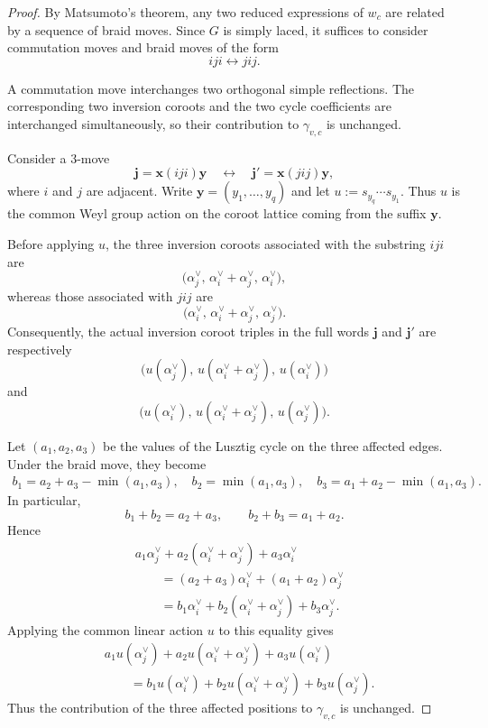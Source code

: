 \documentclass[12pt, reqno]{amsart}
\theoremstyle{plain}
\theoremstyle{definition}
\numberwithin{equation}{section}
\begin{document}
\begin{proof}
By Matsumoto's theorem, any two reduced expressions of \(w_c\) are
related by a sequence of braid moves. Since \(G\) is simply laced, it
suffices to consider commutation moves and braid moves of the form
\[
    iji\longleftrightarrow jij.
\]

A commutation move interchanges two orthogonal simple reflections.
The corresponding two inversion coroots and the two cycle
coefficients are interchanged simultaneously, so their contribution
to \(\gamma_{v,c}\) is unchanged.

Consider a \(3\)-move
\[
    \mathbf j=\mathbf x(iji)\mathbf y
    \quad\longleftrightarrow\quad
    \mathbf j'=\mathbf x(jij)\mathbf y,
\]
where \(i\) and \(j\) are adjacent. Write
\(
    \mathbf y=(y_1,\ldots,y_q)
\)
and let
\(
    u:=s_{y_q}\cdots s_{y_1}.
\)
Thus \(u\) is the common Weyl group action on the coroot lattice
coming from the suffix \(\mathbf y\).

Before applying \(u\), the three inversion coroots associated with
the substring \(iji\) are
\[
    \bigl(
        \alpha_j^\vee,\,
        \alpha_i^\vee+\alpha_j^\vee,\,
        \alpha_i^\vee
    \bigr),
\]
whereas those associated with \(jij\) are
\[
    \bigl(
        \alpha_i^\vee,\,
        \alpha_i^\vee+\alpha_j^\vee,\,
        \alpha_j^\vee
    \bigr).
\]
Consequently, the actual inversion coroot triples in the full words
\(\mathbf j\) and \(\mathbf j'\) are respectively
\[
    \bigl(
        u(\alpha_j^\vee),\,
        u(\alpha_i^\vee+\alpha_j^\vee),\,
        u(\alpha_i^\vee)
    \bigr)
\]
and
\[
    \bigl(
        u(\alpha_i^\vee),\,
        u(\alpha_i^\vee+\alpha_j^\vee),\,
        u(\alpha_j^\vee)
    \bigr).
\]

Let \((a_1,a_2,a_3)\) be the values of the Lusztig cycle on the three
affected edges. Under the braid move, they become
\[
\begin{aligned}
    b_1=a_2+a_3-\min(a_1,a_3),\quad
    b_2=\min(a_1,a_3),\quad
    b_3=a_1+a_2-\min(a_1,a_3).
\end{aligned}
\]
In particular,
\[
    b_1+b_2=a_2+a_3,
    \qquad
    b_2+b_3=a_1+a_2.
\]
Hence
\begin{align*}
    &a_1\alpha_j^\vee
     +a_2(\alpha_i^\vee+\alpha_j^\vee)
     +a_3\alpha_i^\vee\\
    &\qquad
     =(a_2+a_3)\alpha_i^\vee
       +(a_1+a_2)\alpha_j^\vee\\
    &\qquad
     =b_1\alpha_i^\vee
       +b_2(\alpha_i^\vee+\alpha_j^\vee)
       +b_3\alpha_j^\vee.
\end{align*}
Applying the common linear action \(u\) to this equality gives
\begin{align*}
    &a_1u(\alpha_j^\vee)
     +a_2u(\alpha_i^\vee+\alpha_j^\vee)
     +a_3u(\alpha_i^\vee)\\
    &\qquad
     =b_1u(\alpha_i^\vee)
       +b_2u(\alpha_i^\vee+\alpha_j^\vee)
       +b_3u(\alpha_j^\vee).
\end{align*}
Thus the contribution of the three affected positions to
\(\gamma_{v,c}\) is unchanged.


\end{proof}
\end{document}
